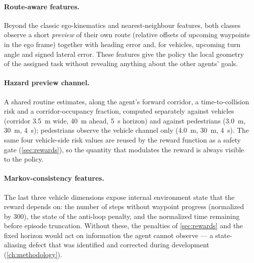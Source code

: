 \paragraph{Route-aware features.}
Beyond the classic ego-kinematics and nearest-neighbour features, both
classes observe a short \emph{preview} of their own route (relative
offsets of upcoming waypoints in the ego frame) together with heading
error and, for vehicles, upcoming turn angle and signed lateral error.
These features give the policy the local geometry of the assigned task
without revealing anything about the other agents' goals.

\paragraph{Hazard preview channel.}
A shared routine estimates, along the agent's forward corridor, a
time-to-collision risk and a corridor-occupancy fraction, computed
separately against vehicles (corridor \SI{3.5}{m} wide, \SI{40}{m} ahead,
\SI{5}{s} horizon) and against pedestrians (\SI{3.0}{m}, \SI{30}{m},
\SI{4}{s}); pedestrians observe the vehicle channel only (\SI{4.0}{m},
\SI{30}{m}, \SI{4}{s}). The same four vehicle-side risk values are reused
by the reward function as a safety gate (\cref{sec:rewards}), so the
quantity that modulates the reward is always visible to the policy.

\paragraph{Markov-consistency features.}
The last three vehicle dimensions expose internal environment state that
the reward depends on: the number of steps without waypoint progress
(normalized by 300), the state of the anti-loop penalty, and the
normalized time remaining before episode truncation. Without these, the
penalties of \cref{sec:rewards} and the fixed horizon would act on
information the agent cannot observe --- a state-aliasing defect that was
identified and corrected during development (\cref{ch:methodology}).

